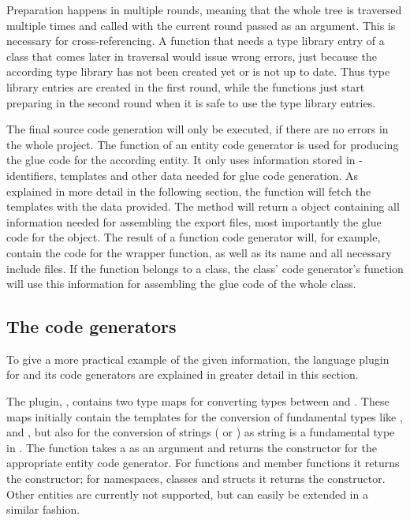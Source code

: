 Preparation happens in multiple rounds, meaning that the whole tree is traversed multiple times and  called with the current round passed as an argument. This is necessary for cross-referencing. A function that needs a type library entry of a class that comes later in traversal would issue wrong errors, just because the according type library has not been created yet or is not up to date. Thus type library entries are created in the first round, while the functions just start preparing in the second round when it is safe to use the type library entries.

The final source code generation will only be executed, if there are no errors in the whole project. The  function of an entity code generator is used for producing the glue code for the according entity.  It only uses information stored in  - identifiers, templates and other data needed for glue code generation. As explained in more detail in the following section, the  function will fetch the templates with the data provided. The method will return a  object containing all information needed for assembling the export files, most importantly the glue code for the object. The result of a function code generator will, for example, contain the code for the wrapper function, as well as its name and all necessary include files. If the function belongs to a class, the class' code generator's  function will use this information for assembling the glue code of the whole class.

\subsection{The  code generators}

To give a more practical example of the given information, the language plugin for  and its code generators are explained in greater detail in this section.

The plugin, , contains two type maps for converting types between  and . These maps initially contain the templates for the conversion of fundamental types like ,  and , but also for the conversion of strings ( or ) as string is a fundamental type in . The function  takes a  as an argument and returns the constructor for the appropriate entity code generator. For functions and member functions it returns the  constructor; for namespaces, classes and structs it returns the  constructor. Other  entities are currently not supported, but can easily be extended in a similar fashion.

